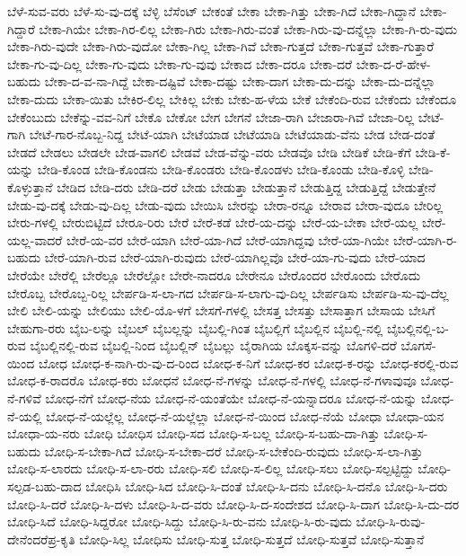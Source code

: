{ಬೆಳೆ-ಸುವ-ವರು
ಬೆಳೆ-ಸು-ವು-ದಕ್ಕೆ
ಬೆಳ್ಳಿ
ಬೆಸೆಂಟ್
ಬೇಕಂತೆ
ಬೇಕಾ
ಬೇಕಾ-ಗಿತ್ತು
ಬೇಕಾ-ಗಿದೆ
ಬೇಕಾ-ಗಿದ್ದಾನೆ
ಬೇಕಾ-ಗಿದ್ದಾರೆ
ಬೇಕಾ-ಗಿಯೇ
ಬೇಕಾ-ಗಿರ-ಲಿಲ್ಲ
ಬೇಕಾ-ಗಿರು
ಬೇಕಾ-ಗಿರು-ವಂತೆ
ಬೇಕಾ-ಗಿರು-ವು-ದನ್ನೆಲ್ಲಾ
ಬೇಕಾ-ಗಿ-ರು-ವುದು
ಬೇಕಾ-ಗಿರು-ವುದೇ
ಬೇಕಾ-ಗಿರು-ವುದೋ
ಬೇಕಾ-ಗಿಲ್ಲ
ಬೇಕಾ-ಗಿವೆ
ಬೇಕಾ-ಗುತ್ತದೆ
ಬೇಕಾ-ಗುತ್ತವೆ
ಬೇಕಾ-ಗುತ್ತಾರೆ
ಬೇಕಾ-ಗು-ವು-ದಿಲ್ಲ
ಬೇಕಾ-ಗು-ವುದು
ಬೇಕಾ-ಗು-ವುವು
ಬೇಕಾದ
ಬೇಕಾ-ದರೂ
ಬೇಕಾ-ದರೆ
ಬೇಕಾ-ದ-ರೆ-ಹೇಳ-ಬಹುದು
ಬೇಕಾ-ದ-ವ-ನಾ-ಗಿದ್ದೆ
ಬೇಕಾ-ದಷ್ಟಿವೆ
ಬೇಕಾ-ದಷ್ಟು
ಬೇಕಾ-ದಾಗ
ಬೇಕಾ-ದು-ದನ್ನು
ಬೇಕಾ-ದು-ದನ್ನೆಲ್ಲಾ
ಬೇಕಾ-ದುದು
ಬೇಕಾ-ಯಿತು
ಬೇಕಿರ-ಲಿಲ್ಲ
ಬೇಕಿಲ್ಲ
ಬೇಕು
ಬೇಕು-ಹ-ಳೆಯ
ಬೇಕೆ
ಬೇಕೆಂದಿ-ರುವ
ಬೇಕೆಂದು
ಬೇಕೆಂದೂ
ಬೇಕೆಂಬುದು
ಬೇಕೆನ್ನು-ವವ-ನಿಗೆ
ಬೇಕೊ
ಬೇಕೋ
ಬೇಗ
ಬೇಗನೆ
ಬೇಜಾ-ರಾಗಿ
ಬೇಜಾರಾ-ಗಿವೆ
ಬೇಜಾ-ರಿಲ್ಲ
ಬೇಟೆ-ಗಾಗಿ
ಬೇಟೆ-ಗಾರ-ನೊಬ್ಬ-ನಿದ್ದ
ಬೇಟೆ-ಯಾಗಿ
ಬೇಟೆಯಾಡ
ಬೇಟೆಯಾಡಿ
ಬೇಟೆಯಾಡು-ವೆನು
ಬೇಡ
ಬೇಡ-ದಂತೆ
ಬೇಡದೆ
ಬೇಡಲು
ಬೇಡಲೇ
ಬೇಡ-ವಾಗಲಿ
ಬೇಡವೆ
ಬೇಡ-ವೆನ್ನು-ವರು
ಬೇಡವೊ
ಬೇಡಿ
ಬೇಡಿಕೆ
ಬೇಡಿ-ಕೆಗೆ
ಬೇಡಿ-ಕೆ-ಯನ್ನು
ಬೇಡಿ-ಕೊಂಡ
ಬೇಡಿ-ಕೊಂಡನು
ಬೇಡಿ-ಕೊಂಡರು
ಬೇಡಿ-ಕೊಂಡಳು
ಬೇಡಿ-ಕೊಂಡು
ಬೇಡಿ-ಕೊಳ್ಳಿ
ಬೇಡಿ-ಕೊಳ್ಳುತ್ತಾನೆ
ಬೇಡಿದ
ಬೇಡಿ-ದರು
ಬೇಡಿ-ದರೆ
ಬೇಡು
ಬೇಡುತ್ತಾ
ಬೇಡುತ್ತಾನೆ
ಬೇಡುತ್ತಿದ್ದ
ಬೇಡುತ್ತಿದ್ದೆ
ಬೇಡುತ್ತೇನೆ
ಬೇಡು-ವು-ದಕ್ಕೆ
ಬೇಡು-ವು-ದಿಲ್ಲ
ಬೇಡು-ವುದು
ಬೇಯಿಸಿ
ಬೇರನ್ನು
ಬೇರಾ-ರನ್ನೂ
ಬೇರಾವ
ಬೇರಾ-ವುದೂ
ಬೇರಿಲ್ಲ
ಬೇರು-ಗಳಲ್ಲಿ
ಬೇರುಬಿಟ್ಟಿದೆ
ಬೇರೂ-ರಿರು
ಬೇರೆ
ಬೇರೆ-ಕಡೆ
ಬೇರೆ-ಯ-ದನ್ನು
ಬೇರೆ-ಯ-ಬೇಕಾ
ಬೇರೆ-ಯಲ್ಲ
ಬೇರೆ-ಯಲ್ಲ-ವಾದರೆ
ಬೇರೆ-ಯ-ವರ
ಬೇರೆ-ಯಾಗಿ
ಬೇರೆ-ಯಾ-ಗಿದೆ
ಬೇರೆ-ಯಾಗಿದ್ದವು
ಬೇರೆ-ಯಾ-ಗಿಯೇ
ಬೇರೆ-ಯಾಗಿ-ರ-ಬಹುದು
ಬೇರೆ-ಯಾಗಿ-ರುವ
ಬೇರೆ-ಯಾಗಿ-ರುವುದು
ಬೇರೆ-ಯಾಗಿಲ್ಲವೊ
ಬೇರೆ-ಯಾ-ಗು-ವುದು
ಬೇರೆ-ಯಾದ
ಬೇರೆಯೇ
ಬೇರೆಲ್ಲಿ
ಬೇರೆಲ್ಲೂ
ಬೇರೆಲ್ಲೋ
ಬೇರೇ-ನಾದರೂ
ಬೇರೇನೂ
ಬೇರೊಂದರ
ಬೇರೊಂದು
ಬೇರೊದು
ಬೇರೊಬ್ಬ
ಬೇರೊಬ್ಬ-ರಿಲ್ಲ
ಬೇರ್ಪಡಿ-ಸ-ಲಾ-ಗದ
ಬೇರ್ಪಡಿ-ಸ-ಲಾಗು-ವು-ದಿಲ್ಲ
ಬೇರ್ಪಡಿಸು
ಬೇರ್ಪಡಿ-ಸು-ವು-ದೆಲ್ಲ
ಬೇಲಿ
ಬೇಲಿ-ಯನ್ನು
ಬೇಲಿಯು
ಬೇಲಿ-ಯೊ-ಳಗೆ
ಬೇಸಗೆ-ಗಳಲ್ಲಿ
ಬೇಸತ್ತ
ಬೇಸತ್ತು
ಬೇಸಾತ್ತಾಗ
ಬೇಸಾಯ
ಬೇಸಿಗೆ
ಬೇಹುಗಾ-ರರು
ಬೈಬ-ಲನ್ನು
ಬೈಬಲ್
ಬೈಬಲ್ಲನ್ನು
ಬೈಬಲ್ಲಿ-ಗಿಂತ
ಬೈಬಲ್ಲಿಗೆ
ಬೈಬಲ್ಲಿನ
ಬೈಬಲ್ಲಿ-ನಲ್ಲಿ
ಬೈಬಲ್ಲಿನಲ್ಲಿ-ಬ-ರುವ
ಬೈಬಲ್ಲಿನಲ್ಲಿ-ರುವ
ಬೈಬಲ್ಲಿ-ನಿಂದ
ಬೈಬಲ್ಲಿನ್
ಬೈಬಲ್ಲು
ಬೈರಾಗಿಯ
ಬೊಕ್ಕಸ-ವನ್ನು
ಬೊಗಳಿ-ದರೆ
ಬೊಗಸೆ-ಯಿಂದ
ಬೋಧ
ಬೋಧ-ಕ-ನಾಗಿ-ರು-ವು-ದ-ರಿಂದ
ಬೋಧ-ಕ-ನಿಗೆ
ಬೋಧ-ಕರ
ಬೋಧ-ಕ-ರನ್ನು
ಬೋಧ-ಕರಲ್ಲಿ-ರುವ
ಬೋಧ-ಕ-ರಾದರೊ
ಬೋಧ-ಕರು
ಬೋಧನೆ
ಬೋಧ-ನೆ-ಗಳನ್ನು
ಬೋಧ-ನೆ-ಗಳಲ್ಲಿ
ಬೋಧ-ನೆ-ಗಳಾವುವೂ
ಬೋಧ-ನೆ-ಗಳಿವೆ
ಬೋಧ-ನೆಗೆ
ಬೋಧ-ನೆಯ
ಬೋಧ-ನೆ-ಯಂತೆಯೇ
ಬೋಧ-ನೆ-ಯನ್ನಾದರೂ
ಬೋಧ-ನೆ-ಯನ್ನು
ಬೋಧ-ನೆ-ಯಲ್ಲಿ
ಬೋಧ-ನೆ-ಯಲ್ಲೆಲ್ಲ
ಬೋಧ-ನೆ-ಯಲ್ಲೆಲ್ಲಾ
ಬೋಧ-ನೆ-ಯಿಂದ
ಬೋಧ-ನೆಯೆ
ಬೋಧಾ
ಬೋಧಾ-ಯನ
ಬೋಧಾ-ಯ-ನರು
ಬೋಧಿ
ಬೋಧಿಸ
ಬೋಧಿ-ಸದ
ಬೋಧಿ-ಸ-ಬಲ್ಲ
ಬೋಧಿ-ಸ-ಬಹು-ದಾ-ಗಿತ್ತು
ಬೋಧಿ-ಸ-ಬಹುದು
ಬೋಧಿ-ಸ-ಬೇಕಾ-ಗಿದೆ
ಬೋಧಿ-ಸ-ಬೇಕಾ-ದರೆ
ಬೋಧಿ-ಸ-ಬೇಕೆಂದಿ-ರುವುದು
ಬೋಧಿ-ಸ-ಲಾ-ಗಿತ್ತು
ಬೋಧಿ-ಸ-ಲಾರದು
ಬೋಧಿ-ಸ-ಲಾ-ರರು
ಬೋಧಿ-ಸಲಿ
ಬೋಧಿ-ಸ-ಲಿಲ್ಲ
ಬೋಧಿ-ಸಲು
ಬೋಧಿ-ಸಲ್ಪಟ್ಟಿದ್ದು
ಬೋಧಿ-ಸಲ್ಪಡ-ಬಹು-ದಾದ
ಬೋಧಿಸಿ
ಬೋಧಿ-ಸಿದ
ಬೋಧಿ-ಸಿ-ದಂತೆ
ಬೋಧಿ-ಸಿ-ದನು
ಬೋಧಿ-ಸಿ-ದನೊ
ಬೋಧಿ-ಸಿ-ದರು
ಬೋಧಿ-ಸಿ-ದರೆ
ಬೋಧಿ-ಸಿ-ದಳು
ಬೋಧಿ-ಸಿ-ದ-ವರು
ಬೋಧಿ-ಸಿ-ದ-ಸಂದೇಶದ
ಬೋಧಿ-ಸಿ-ದಾಗ
ಬೋಧಿ-ಸಿ-ದು-ದರ
ಬೋಧಿ-ಸಿದೆ
ಬೋಧಿ-ಸಿದ್ದರೋ
ಬೋಧಿ-ಸಿದ್ದು
ಬೋಧಿ-ಸಿ-ರು-ವನು
ಬೋಧಿ-ಸಿ-ರು-ವುದು
ಬೋಧಿ-ಸಿ-ರುವು-ದೇನೆಂದರೆಪ್ರ-ಕೃತಿ
ಬೋಧಿ-ಸಿಲ್ಲ
ಬೋಧಿಸು
ಬೋಧಿ-ಸುತ್ತ
ಬೋಧಿ-ಸುತ್ತದೆ
ಬೋಧಿ-ಸುತ್ತವೆ
ಬೋಧಿ-ಸುತ್ತಾನೆ
}
